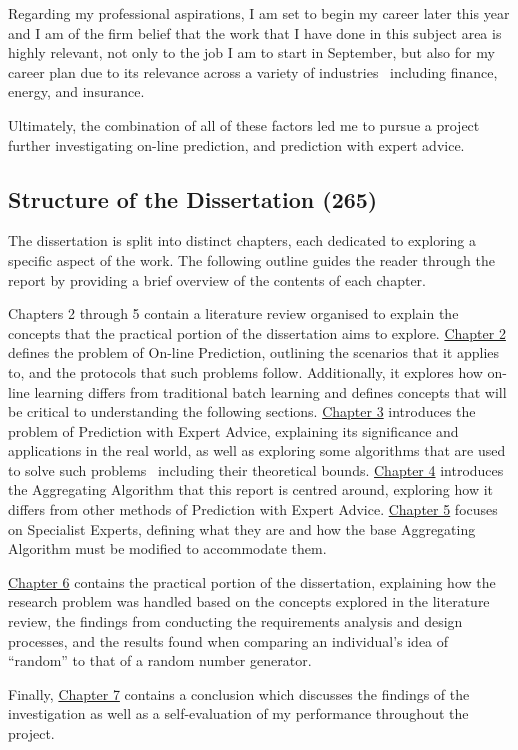 Regarding my professional aspirations, I am set to begin my career later this year and I am of the firm belief that the work that I have done in this subject area is highly relevant, not only to the job I am to start in September, but also for my career plan due to its relevance across a variety of industries \textendash\ including finance, energy, and insurance.

Ultimately, the combination of all of these factors led me to pursue a project further investigating on-line prediction, and prediction with expert advice.

\subsection{Structure of the Dissertation \textbf{(265)}}
The dissertation is split into distinct chapters, each dedicated to exploring a specific aspect of the work. The following outline guides the reader through the report by providing a brief overview of the contents of each chapter.

Chapters 2 through 5 contain a literature review organised to explain the concepts that the practical portion of the dissertation aims to explore. \hyperref[section:On-line_Prediction]{Chapter 2} defines the problem of On-line Prediction, outlining the scenarios that it applies to, and the protocols that such problems follow. Additionally, it explores how on-line learning differs from traditional batch learning and defines concepts that will be critical to understanding the following sections. \hyperref[section:Prediciton_with_Expert_Advice]{Chapter 3} introduces the problem of Prediction with Expert Advice, explaining its significance and applications in the real world, as well as exploring some algorithms that are used to solve such problems \textendash\ including their theoretical bounds. \hyperref[section:Aggregating_Algorithm]{Chapter 4} introduces the Aggregating Algorithm that this report is centred around, exploring how it differs from other methods of Prediction with Expert Advice. \hyperref[section:Specialist_Experts]{Chapter 5} focuses on Specialist Experts, defining what they are and how the base Aggregating Algorithm must be modified to accommodate them.

\hyperref[section:Practical]{Chapter 6} contains the practical portion of the dissertation, explaining how the research problem was handled based on the concepts explored in the literature review, the findings from conducting the requirements analysis and design processes, and the results found when comparing an individual's idea of ``random'' to that of a random number generator.

Finally, \hyperref[section:Conclusion]{Chapter 7} contains a conclusion which discusses the findings of the investigation as well as a self-evaluation of my performance throughout the project.